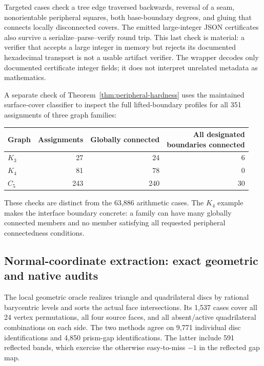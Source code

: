 Targeted cases check a tree edge traversed backwards, reversal of a seam,
nonorientable peripheral squares, both base-boundary degrees, and gluing
that connects locally disconnected covers. The emitted large-integer JSON
certificates also survive a serialize--parse--verify round trip. This last
check is material: a verifier that accepts a large integer in memory but
rejects its documented hexadecimal transport is not a usable artifact
verifier. The wrapper decodes only documented certificate integer fields;
it does not interpret unrelated metadata as mathematics.

A separate check of Theorem~\ref{thm:peripheral-hardness} uses the maintained
surface-cover classifier to inspect the full lifted-boundary profiles for
all 351 assignments of three graph families:

\begin{center}
\small
\begin{tabular}{lrrr}
\toprule
Graph & Assignments & Globally connected & \shortstack{All designated\\boundaries connected}\\
\midrule
$K_3$ & 27 & 24 & 6\\
$K_4$ & 81 & 78 & 0\\
$C_5$ & 243 & 240 & 30\\
\bottomrule
\end{tabular}
\end{center}

These checks are distinct from the 63,886 arithmetic cases. The $K_4$
example makes the interface boundary concrete: a family can have many
globally connected members and no member satisfying all requested
peripheral connectedness conditions.

\subsection{Normal-coordinate extraction: exact geometric and native audits}

The local geometric oracle realizes triangle and quadrilateral discs by
rational barycentric levels and sorts the actual face intersections.
Its 1,537 cases cover all 24 vertex permutations, all four source faces,
and all absent/active quadrilateral combinations on each side. The two
methods agree on 9,771 individual disc identifications and 4,850 prism-gap
identifications. The latter include 591 reflected bands, which exercise
the otherwise easy-to-miss $-1$ in the reflected gap map.

